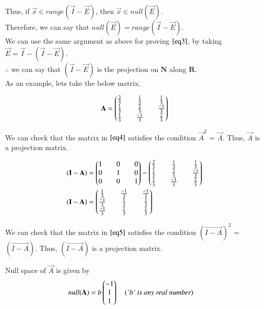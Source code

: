 \documentclass[journal,12pt,twocolumn]{IEEEtran}
\begin{document}
	Thus, if $\vec{x} \in range(\Vec{I} - \Vec{E})$, then $\Vec{x} \in null(\Vec{E})$.\\
	
	Therefore, we can say that $null(\Vec{E}) = range(\Vec{I} - \Vec{E})$. \\
	
	We can use the same argument as above for proving $\eqref{eq3}$, by taking $\Vec{E} = \Vec{I} - (\Vec{I} - \Vec{E})$.\\
	
	$\therefore$ we can say that $(\Vec{I} - \Vec{E})$ is the projection on $\mathbf{N}$ along $\mathbf{R}$.\\
	
	As an example, lets take the below matrix.
	
	\begin{align}\label{eq4}
		\mathbf{A} = \begin{pmatrix}\frac{2}{3}&&\frac{1}{3}&&\frac{1}{3}\\
			\frac{1}{3}&&\frac{2}{3}&&\frac{-1}{3}\\
			\frac{1}{3}&&\frac{-1}{3}&&\frac{2}{3}\end{pmatrix}
	\end{align}
	
	We can check that the matrix in $\eqref{eq4}$ satisfies the condition $\vec{A}^{2}$ = $\vec{A}$. Thus, $\vec{A}$ is a projection matrix.
	
	\begin{align}\label{eq5}
		(\mathbf{I-A}) &= \begin{pmatrix}1&&0&&0\\
			0&&1&&0\\
			0&&0&&1\end{pmatrix} - \begin{pmatrix}\frac{2}{3}&&\frac{1}{3}&&\frac{1}{3}\\
			\frac{1}{3}&&\frac{2}{3}&&\frac{-1}{3}\\
			\frac{1}{3}&&\frac{-1}{3}&&\frac{2}{3}\end{pmatrix} \nonumber\\
		(\mathbf{I-A}) &= \begin{pmatrix}\frac{1}{3}&&\frac{-1}{3}&&\frac{-1}{3}\\
			\frac{-1}{3}&&\frac{1}{3}&&\frac{1}{3}\\
			\frac{-1}{3}&&\frac{1}{3}&&\frac{1}{3}\end{pmatrix}
	\end{align} 
	
	We can check that the matrix in $\eqref{eq5}$ satisfies the condition $(\vec{I-A})^{2}$ = $(\vec{I-A})$. Thus, $(\vec{I-A})$ is a projection matrix.
	
	Null space of $\vec{A}$ is given by
	\begin{align}\label{eq6}
		null(\Vec{A}) &= b \myvec{-1\\1\\1} \quad ( \textit{'b' is any real number})
	\end{align}
	
\end{document}
